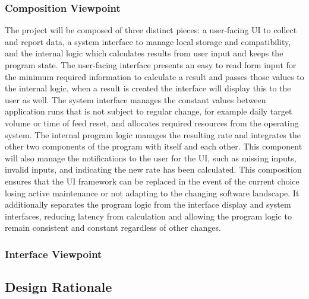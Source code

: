 \documentclass[onecolumn, draftclsnofoot,10pt, compsoc]{IEEEtran}
\begin{document}
\subsubsection{Composition Viewpoint}
The project will be composed of three distinct pieces: a user-facing UI to collect and report data, a system interface to manage local storage and compatibility, and the internal logic which calculates results from user input and keeps the program state.
The user-facing interface presents an easy to read form input for the minimum required information to calculate a result and passes those values to the internal logic, when a result is created the interface will display this to the user as well.
The system interface manages the constant values between application runs that is not subject to regular change, for example daily target volume or time of feed reset, and allocates required resources from the operating system.
The internal program logic manages the resulting rate and integrates the other two components of the program with itself and each other.
This component will also manage the notifications to the user for the UI, such as missing inputs, invalid inputs, and indicating the new rate has been calculated.
This composition ensures that the UI framework can be replaced in the event of the current choice losing active maintenance or not adapting to the changing software landscape.
It additionally separates the program logic from the interface display and system interfaces, reducing latency from calculation and allowing the program logic to remain consistent and constant regardless of other changes.
\subsubsection{Interface Viewpoint}

\subsection{Design Rationale}

\end{document}
